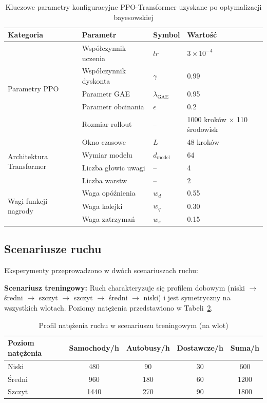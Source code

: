 \documentclass[10pt,a4paper]{article}
\begin{document}
\begin{table}[H]
\centering
\small
\setlength{\tabcolsep}{4pt}
\caption{Kluczowe parametry konfiguracyjne PPO-Transformer uzyskane po optymalizacji bayesowskiej}
\label{tab:1}
\begin{tabularx}{\textwidth}{l>{\raggedright\arraybackslash}X l l}
\toprule
Kategoria & Parametr & Symbol & Wartość \\
\midrule
\multirow{5}{*}{Parametry PPO} & Współczynnik uczenia & $lr$ & $3 \times 10^{-4}$ \\
 & Współczynnik dyskonta & $\gamma$ & 0.99 \\
 & Parametr GAE & $\lambda_{\text{GAE}}$ & 0.95 \\
 & Parametr obcinania & $\epsilon$ & 0.2 \\
 & Rozmiar rollout & -- & 1000 kroków $\times$ 110 środowisk \\
\midrule
\multirow{4}{*}{Architektura Transformer} & Okno czasowe & $L$ & 48 kroków \\
 & Wymiar modelu & $d_{\text{model}}$ & 64 \\
 & Liczba głowic uwagi & -- & 4 \\
 & Liczba warstw & -- & 2 \\
\midrule
\multirow{3}{*}{Wagi funkcji nagrody} & Waga opóźnienia & $w_d$ & 0.55 \\
 & Waga kolejki & $w_q$ & 0.30 \\
 & Waga zatrzymań & $w_s$ & 0.15 \\
\bottomrule
\end{tabularx}
\end{table}

\subsection{Scenariusze ruchu}

Eksperymenty przeprowadzono w dwóch scenariuszach ruchu:

\textbf{Scenariusz treningowy:} Ruch charakteryzuje się profilem dobowym (niski $\rightarrow$ średni $\rightarrow$ szczyt $\rightarrow$ szczyt $\rightarrow$ średni $\rightarrow$ niski) i jest symetryczny na wszystkich wlotach. Poziomy natężenia przedstawiono w Tabeli~\ref{tab:2}.

\begin{table}[H]
\centering
\caption{Profil natężenia ruchu w scenariuszu treningowym (na wlot)}
\label{tab:2}
\begin{tabular}{lcccc}
\toprule
Poziom natężenia & Samochody/h & Autobusy/h & Dostawcze/h & Suma/h \\
\midrule
Niski & 480 & 90 & 30 & 600 \\
Średni & 960 & 180 & 60 & 1200 \\
Szczyt & 1440 & 270 & 90 & 1800 \\
\bottomrule
\end{tabular}
\end{table}
\end{document}
